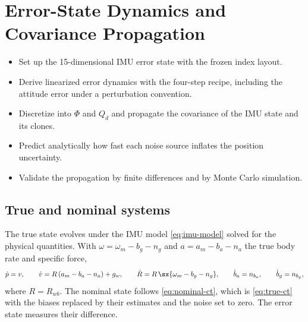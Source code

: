 \chapter{Error-State Dynamics and Covariance Propagation}
\label{ch:errordyn}

\begin{objectives}
\begin{itemize}
  \item Set up the 15-dimensional IMU error state with the frozen index layout.
  \item Derive linearized error dynamics with the four-step recipe, including the attitude error under a
        perturbation convention.
  \item Discretize into $\Phi$ and $Q_d$ and propagate the covariance of the IMU state and its clones.
  \item Predict analytically how fast each noise source inflates the position uncertainty.
  \item Validate the propagation by finite differences and by Monte Carlo simulation.
\end{itemize}
\end{objectives}

\section{True and nominal systems}

The true state evolves under the IMU model \eqref{eq:imu-model} solved for the physical quantities. With
$\omega = \omega_m - b_g - n_g$ and $a = a_m - b_a - n_a$ the true body rate and specific force,
\begin{equation}
  \dot p = v, \qquad \dot v = R\,(a_m - b_a - n_a) + g_w, \qquad \dot R = R\,\sx{\omega_m - b_g - n_g},
  \qquad \dot b_a = n_{b_a}, \qquad \dot b_g = n_{b_g},
  \label{eq:true-ct}
\end{equation}
where $R = R_{wb}$. The nominal state follows \eqref{eq:nominal-ct}, which is \eqref{eq:true-ct} with the biases replaced
by their estimates and the noise set to zero. The error state measures their difference.

